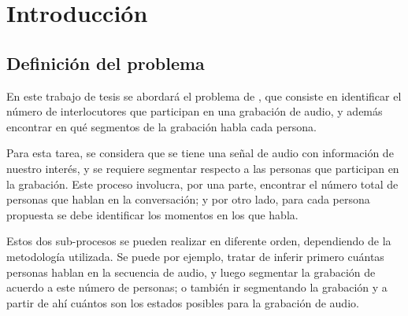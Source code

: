 
\chapter{Introducción}\label{ch:chap1}


\section{Definición del problema} 
\label{sec:definicion}
        
En este trabajo de tesis se abordará el problema de \SD, que consiste en identificar el número de interlocutores que participan en una grabación de audio, y además encontrar en qué segmentos de la grabación habla cada persona.

Para esta tarea, se considera que se tiene una señal de audio con información de nuestro interés, y se requiere segmentar respecto a las personas que participan en la grabación. Este proceso involucra, por una parte, encontrar el número total de personas que hablan en la conversación; y por otro lado, para cada persona propuesta se debe identificar los momentos en los que habla.

Estos dos sub-procesos se pueden realizar en diferente orden, dependiendo de la metodología utilizada. Se puede por ejemplo, tratar de inferir primero cuántas personas hablan en la secuencia de audio, y luego segmentar la grabación de acuerdo a este número de personas; o también ir segmentando la grabación y a partir de ahí cuántos son los estados posibles para la grabación de audio.


